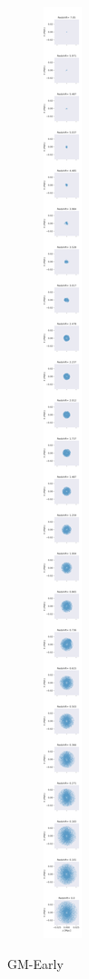 \documentclass{article}
\begin{document}
\begin{figure}
\begin{subfigure} {.325\columnwidth}
		\end{subfigure}
			\hfill
		\begin{subfigure} {.325\columnwidth}
				\centering 
				\includegraphics[width=\columnwidth]{../../plots/coordinates_plotter/GM-Early_z-x_coordinates_evolution.png}
		\end{subfigure}
		
		\caption{GM-Early}
	\end{figure}
\end{document}
